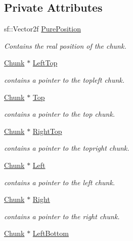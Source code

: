 \subsection*{Private Attributes}
\begin{DoxyCompactItemize}
\item 
sf\-::\-Vector2f \hyperlink{class_chunk_ace1577872b1189bc7fd88a9b3817ce98}{Pure\-Position}
\begin{DoxyCompactList}\small\item\em Contains the real position of the chunk. \end{DoxyCompactList}\item 
\hyperlink{class_chunk}{Chunk} $\ast$ \hyperlink{class_chunk_a877d51226eaa97c40c05223987514d59}{Left\-Top}
\begin{DoxyCompactList}\small\item\em contains a pointer to the topleft chunk. \end{DoxyCompactList}\item 
\hyperlink{class_chunk}{Chunk} $\ast$ \hyperlink{class_chunk_ae841d5ab24dfa5ef8865cb4fa05d089d}{Top}
\begin{DoxyCompactList}\small\item\em contains a pointer to the top chunk. \end{DoxyCompactList}\item 
\hyperlink{class_chunk}{Chunk} $\ast$ \hyperlink{class_chunk_a8a7593c89d4fe5ed193e68b9ed40016b}{Right\-Top}
\begin{DoxyCompactList}\small\item\em contains a pointer to the topright chunk. \end{DoxyCompactList}\item 
\hyperlink{class_chunk}{Chunk} $\ast$ \hyperlink{class_chunk_aee27c2584364a58dc8811e9ada0695dd}{Left}
\begin{DoxyCompactList}\small\item\em contains a pointer to the left chunk. \end{DoxyCompactList}\item 
\hyperlink{class_chunk}{Chunk} $\ast$ \hyperlink{class_chunk_a0bcf134e2aba0ca49370272c2b3f17a4}{Right}
\begin{DoxyCompactList}\small\item\em contains a pointer to the right chunk. \end{DoxyCompactList}\item 
\hyperlink{class_chunk}{Chunk} $\ast$ \hyperlink{class_chunk_af3577f37139ffeb74181d9ce3c48f5e6}{Left\-Bottom}

\end{DoxyCompactItemize}
